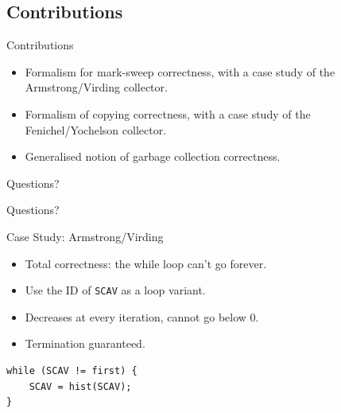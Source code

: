 \documentclass[usenames,dvipsnames]{beamer}
\begin{document}
\subsection{Contributions}

\begin{frame}{Contributions}
  \begin{itemize}
  \item Formalism for mark-sweep correctness, with a case study of the
    Armstrong/Virding collector.
  \item Formalism of copying correctness, with a case study of the
    Fenichel/Yochelson collector.
  \item Generalised notion of garbage collection correctness.
  \end{itemize}

\end{frame}


\begin{frame}{Questions?}
  \begin{center}
    \huge Questions?
  \end{center}

  
  \nocite{Myreen10,McCreight07}
  \footnotesize
  
\end{frame}


\begin{frame}[fragile]{Case Study: Armstrong/Virding}
  \begin{itemize}
  \item Total correctness: the while loop can't go forever.
  \item Use the ID of \texttt{SCAV} as a loop variant.
  \item Decreases at every iteration, cannot go below 0.
  \item Termination guaranteed.
  \end{itemize}

  \begin{lstlisting}
while (SCAV != first) {
    SCAV = hist(SCAV);
}
  \end{lstlisting}

\end{frame}
\end{document}
